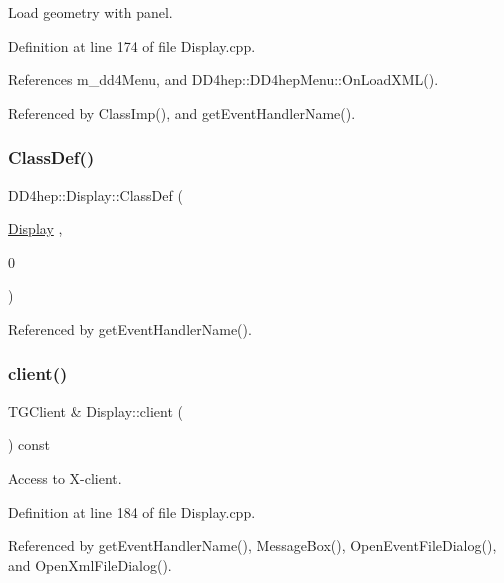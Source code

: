 Load geometry with panel. 



Definition at line 174 of file Display.\+cpp.



References m\+\_\+dd4\+Menu, and D\+D4hep\+::\+D\+D4hep\+Menu\+::\+On\+Load\+X\+M\+L().



Referenced by Class\+Imp(), and get\+Event\+Handler\+Name().

\hypertarget{class_d_d4hep_1_1_display_a400873f854d08d19a22939eab0bc5b5a}{}\label{class_d_d4hep_1_1_display_a400873f854d08d19a22939eab0bc5b5a} 
\subsubsection{\texorpdfstring{Class\+Def()}{ClassDef()}}
{\footnotesize\ttfamily D\+D4hep\+::\+Display\+::\+Class\+Def (\begin{DoxyParamCaption}\item[{\hyperlink{class_d_d4hep_1_1_display}{Display}}]{,  }\item[{0}]{ }\end{DoxyParamCaption})}



Referenced by get\+Event\+Handler\+Name().

\hypertarget{class_d_d4hep_1_1_display_afb0dd99044703b6a3ac163621e3d22f1}{}\label{class_d_d4hep_1_1_display_afb0dd99044703b6a3ac163621e3d22f1} 
\subsubsection{\texorpdfstring{client()}{client()}}
{\footnotesize\ttfamily T\+G\+Client \& Display\+::client (\begin{DoxyParamCaption}{ }\end{DoxyParamCaption}) const}



Access to X-\/client. 



Definition at line 184 of file Display.\+cpp.



Referenced by get\+Event\+Handler\+Name(), Message\+Box(), Open\+Event\+File\+Dialog(), and Open\+Xml\+File\+Dialog().

